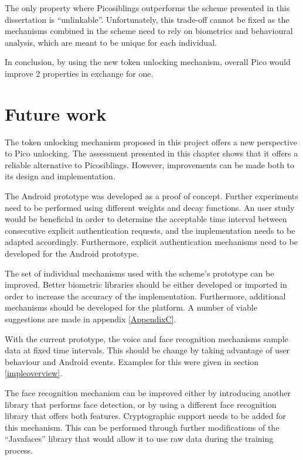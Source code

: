 The only property where Picosiblings outperforms the scheme presented in this dissertation is ``unlinkable''. Unfortunately, this trade-off cannot be fixed	as the mechanisms combined in the scheme need to rely on biometrics and behavioural analysis, which are meant to be unique for each individual. 

In conclusion, by using the new token unlocking mechanism, overall Pico would improve 2 properties in exchange for one.

\section{Future work}
The token unlocking mechanism proposed in this project offers a new perspective to Pico unlocking. The assessment presented in this chapter shows that it offers a reliable alternative to Picosiblings. However, improvements can be made both to its design and implementation.

The Android prototype was developed as a proof of concept. Further experiments need to be performed using different weights and decay functions. An user study would be beneficial in order to determine the acceptable time interval between consecutive explicit authentication requests, and the implementation needs to be adapted accordingly. Furthermore, explicit authentication mechanisms need to be developed for the Android prototype.

The set of individual mechanisms used with the scheme's prototype can be improved. Better biometric libraries should be either developed or imported in order to increase the accuracy of the implementation. Furthermore, additional mechanisms should be developed for the platform. A number of viable suggestions are made in appendix \ref{AppendixC}.

With the current prototype, the voice and face recognition mechanisms sample data at fixed time intervals. This should be change by taking advantage of user behaviour and Android events. Examples for this were given in section \ref{impleoverview}. 

The face recognition mechanism can be improved either by introducing another library that performs face detection, or by using a different face recognition library that offers both features. Cryptographic support needs to be added for this mechanism. This can be performed through further modifications of the ``Javafaces'' library that would allow it to use raw data during the training process.

